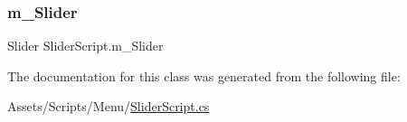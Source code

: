 \mbox{\label{class_slider_script_ae8609f184b3c905fcb72cebfca2d4adc}} 
\subsubsection{\texorpdfstring{m\_Slider}{m\_Slider}}
{\footnotesize\ttfamily Slider Slider\+Script.\+m\+\_\+\+Slider}



The documentation for this class was generated from the following file\+:\begin{DoxyCompactItemize}
\item 
Assets/\+Scripts/\+Menu/\mbox{\hyperlink{_slider_script_8cs}{Slider\+Script.\+cs}}\end{DoxyCompactItemize}
